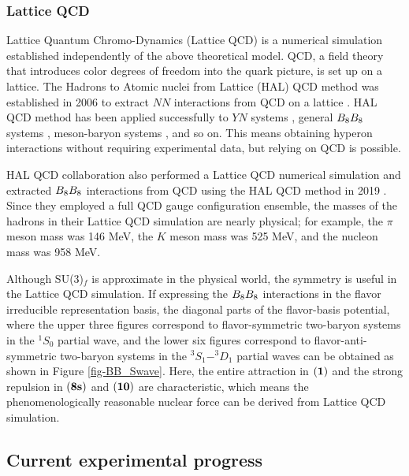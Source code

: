\subsubsection{Lattice QCD}
\label{sec-LatticeQCD}
Lattice Quantum Chromo-Dynamics (Lattice QCD) is a numerical simulation established independently of the above theoretical model. QCD, a field theory that introduces color degrees of freedom into the quark picture, is set up on a lattice. The Hadrons to Atomic nuclei from Lattice (HAL) QCD method was established in 2006 to extract $NN$ interactions from QCD on a lattice \cite{QCD-2006}. HAL QCD method has been applied successfully to $YN$ systems \cite{QCD-YN}, general $B_{8}B_{8}$ systems \cite{QCD-BB}, meson-baryon systems \cite{QCD-MB}, and so on. This means obtaining hyperon interactions without requiring experimental data, but relying on QCD is possible. 

HAL QCD collaboration also performed a Lattice QCD numerical simulation and extracted $B_{8}B_{8}$ interactions from QCD using the HAL QCD method in 2019 \cite{QCD-2019}. Since they employed a full QCD gauge configuration ensemble, the masses of the hadrons in their Lattice QCD simulation are nearly physical; for example, the $\pi$ meson mass was 146 MeV, the $K$ meson mass was 525 MeV, and the nucleon mass was 958 MeV. 

Although SU(3)$_f$ is approximate in the physical world, the symmetry is useful in the Lattice QCD simulation. If expressing the $B_{8}B_{8}$ interactions in the flavor irreducible representation basis, the diagonal parts of the flavor-basis potential, where the upper three figures correspond to flavor-symmetric two-baryon systems in the $^1S_0$ partial wave, and the lower six figures correspond to flavor-anti-symmetric two-baryon systems in the $^3S_1$$-$$^3D_1$ partial waves can be obtained as shown in Figure \ref{fig-BB_Swave}. Here, the entire attraction in ${\bf (1)}$ and the strong repulsion in ${\bf (8s)}$ and ${\bf (10)}$ are characteristic, which means the phenomenologically reasonable nuclear force can be derived from Lattice QCD simulation.


\clearpage
\subsection{Current experimental progress}

